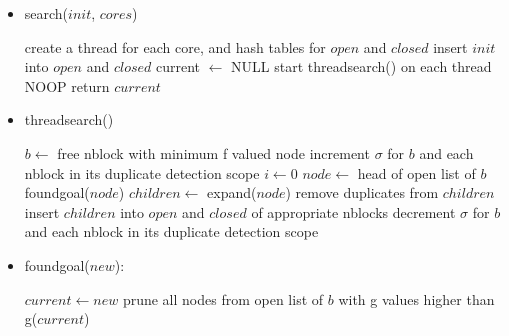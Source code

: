 \documentclass{article}
\begin{document}
\begin{itemize}
  \item search($init$, $cores$)
  \begin{algorithmic}[1]
  \STATE create a thread for each core, and hash tables for $open$ and $closed$
  \STATE insert $init$ into $open$ and $closed$
  \STATE current $\leftarrow$ NULL
  \STATE start threadsearch() on each thread
    \STATE NOOP
  \ENDWHILE
  \STATE return $current$
  \end{algorithmic}

  \item threadsearch()
  \begin{algorithmic}[1]
    \STATE $b \leftarrow$ free nblock with minimum f valued node
    \STATE increment $\sigma$ for $b$ and each nblock in its duplicate detection scope
      \STATE $i \leftarrow 0$
    \ENDIF
    \REPEAT
      \STATE $node \leftarrow$ head of open list of $b$
        \STATE foundgoal($node$)
        \STATE $children \leftarrow$ expand($node$)
        \STATE remove duplicates from $children$
        \STATE insert $children$ into $open$ and $closed$ of appropriate nblocks
      \ENDIF
    \STATE {}
    \STATE decrement $\sigma$ for $b$ and each nblock in its duplicate detection scope
  \ENDWHILE
  \end{algorithmic}

  \item foundgoal($new$):
  \begin{algorithmic}[1]
        \STATE $current \leftarrow new$
        \STATE prune all nodes from open list of $b$ with g values higher than g($current$)
      \ENDIF
  \end{algorithmic}
\end{itemize}
\end{document}
